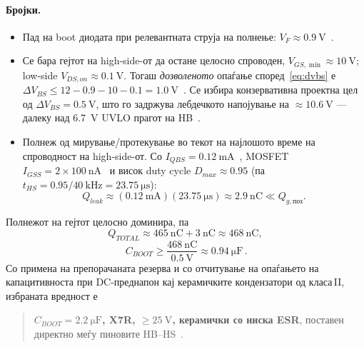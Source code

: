 \documentclass[journal,onecolumn,11pt]{IEEEtran}
\begin{document}
\paragraph{Бројки.}
\begin{itemize}[leftmargin=1.4em]
  \item Пад на boot диодата при релевантната струја на полнење:
        $V_F\approx\SI{0.9}{\volt}$~\cite{ucc27211}.
  \item Се бара гејтот на high-side-от да остане целосно спроводен,
        $V_{GS,\min}\approx\SI{10}{\volt}$; low-side $V_{DS,on}\approx\SI{0.1}{\volt}$.
        Тогаш \emph{дозволеното} опаѓање според~\eqref{eq:dvbs} е
        $\Delta V_{BS}\le 12-0.9-10-0.1=\SI{1.0}{\volt}$~\cite{infineon_monolithic}.
        Се избира конзервативна проектна цел од \textbf{$\Delta V_{BS}=\SI{0.5}{\volt}$},
        што го задржува лебдечкото напојување на $\approx\SI{10.6}{\volt}$ --- далеку
        над \SI{6.7}{\volt} UVLO прагот на HB~\cite{ucc27211}.
  \item Полнеж од мирување/протекување во текот на најлошото време на спроводност на
        high-side-от. Со $I_{QBS}=\SI{0.12}{\milli\ampere}$~\cite{ucc27211}, MOSFET
        $I_{GSS}=2\times\SI{100}{\nano\ampere}$~\cite{ipt015ds} и висок duty cycle
        $D_{max}\approx 0.95$ (па $t_{HS}=0.95/\SI{40}{\kilo\hertz}=\SI{23.75}{\micro\second}$):
        \begin{equation}
        Q_{leak}\approx(\SI{0.12}{\milli\ampere})(\SI{23.75}{\micro\second})
                  \approx\SI{2.9}{\nano\coulomb}\ll Q_{g,\text{поз}}.
        \end{equation}
\end{itemize}
Полнежот на гејтот целосно доминира, па
\begin{equation}
Q_{TOTAL}\approx\SI{465}{\nano\coulomb}+\SI{3}{\nano\coulomb}\approx\SI{468}{\nano\coulomb},
\end{equation}
\begin{equation}
\boxed{\,C_{BOOT}\ge\dfrac{\SI{468}{\nano\coulomb}}{\SI{0.5}{\volt}}\approx\SI{0.94}{\micro\farad}\,}.
\end{equation}
Со примена на препорачаната резерва и со отчитување на опаѓањето на капацитивноста
при DC-преднапон кај керамичките кондензатори од класа\,II, избраната вредност е
\begin{quote}
\textbf{$C_{BOOT}=\SI{2.2}{\micro\farad}$, X7R, $\ge\SI{25}{\volt}$, керамички со
ниска ESR}, поставен директно меѓу пиновите HB--HS~\cite{ucc27211,infineon_maxboot}.
\end{quote}
\end{document}
